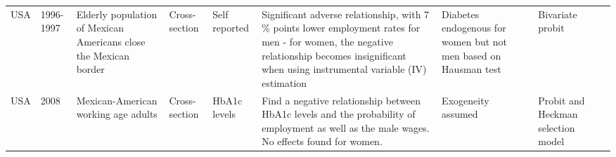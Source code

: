 \documentclass[12pt,english]{article}
\begin{document}
\begin{appendix}
{\begin{landscape}
\begin{tabularx}{\linewidth}{m m m m b b b b m}
USA       & 1996-1997  & Elderly population of Mexican Americans close the Mexican border & Cross-section           & Self reported                                & Significant adverse relationship, with 7 \% points lower employment rates for men - for women, the negative relationship becomes insignificant when using instrumental variable (IV) estimation                                                                                                                                                                                                                                                                                                                                                                                                                                                                  & Diabetes endogenous for women but not men based on Hausman test                         & Bivariate probit                                                                                                                                                                                                                                                                                     & \textcite{Brown2005}            \\
USA       & 2008       & Mexican-American working age adults                              & Cross-section           & HbA1c levels                                 & Find a negative  relationship between HbA1c levels and the probability of employment as well as the male wages. No effects found for women.                                                                                                                                                                                                                                                                                                                                                                                                                                                                                                                      & Exogeneity assumed                                                                      & Probit and Heckman selection model                                                                                                                                                                                                                                                                   & \textcite{BrownIII2011}            \\

\end{tabularx}
\end{landscape}}
\end{appendix}
\end{document}
